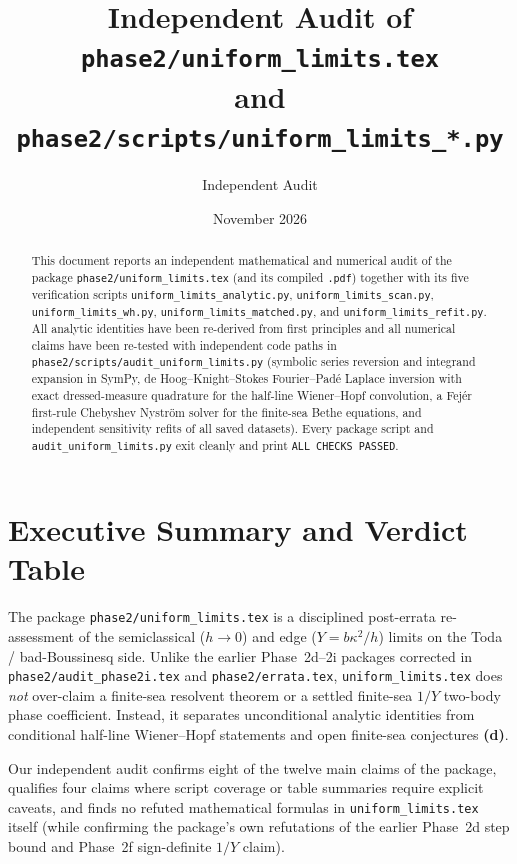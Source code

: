\documentclass[11pt,a4paper]{article}
\title{Independent Audit of \texttt{phase2/uniform\_limits.tex}\\
and \texttt{phase2/scripts/uniform\_limits\_*.py}}
\author{Independent Audit}
\date{November 2026}
\newcommand{\D}{\textbf{(d)}}
\newcommand{\scr}[1]{\texttt{#1}}
\begin{document}
\sloppy
\maketitle

\begin{abstract}
This document reports an independent mathematical and numerical audit of the
package \scr{phase2/uniform\_limits.tex} (and its compiled \scr{.pdf}) together
with its five verification scripts \scr{uniform\_limits\_analytic.py},
\scr{uniform\_limits\_scan.py}, \scr{uniform\_limits\_wh.py},
\scr{uniform\_limits\_matched.py}, and \scr{uniform\_limits\_refit.py}.
All analytic identities have been re-derived from first principles and all
numerical claims have been re-tested with independent code paths in
\scr{phase2/scripts/audit\_uniform\_limits.py} (symbolic series reversion and
integrand expansion in SymPy, de Hoog--Knight--Stokes Fourier--Pad\'e Laplace
inversion with exact dressed-measure quadrature for the half-line Wiener--Hopf
convolution, a Fej\'er first-rule Chebyshev Nystr\"om solver for the finite-sea
Bethe equations, and independent sensitivity refits of all saved datasets). Every
package script and \scr{audit\_uniform\_limits.py} exit cleanly and print
\texttt{ALL CHECKS PASSED}.
\end{abstract}

\section{Executive Summary and Verdict Table}

The package \scr{phase2/uniform\_limits.tex} is a disciplined post-errata
re-assessment of the semiclassical ($h\to 0$) and edge ($Y=b\kappa^2/h$) limits
on the Toda / bad-Boussinesq side. Unlike the earlier Phase~2d--2i packages
corrected in \scr{phase2/audit\_phase2i.tex} and \scr{phase2/errata.tex},
\scr{uniform\_limits.tex} does \emph{not} over-claim a finite-sea resolvent
theorem or a settled finite-sea $1/Y$ two-body phase coefficient. Instead, it
separates unconditional analytic identities from conditional half-line
Wiener--Hopf statements and open finite-sea conjectures \D.

Our independent audit confirms eight of the twelve main claims of the
package, qualifies four claims where script coverage or table summaries require
explicit caveats, and finds no refuted mathematical formulas in
\scr{uniform\_limits.tex} itself (while confirming the package's own refutations
of the earlier Phase~2d step bound and Phase~2f sign-definite $1/Y$ claim).
\end{document}
